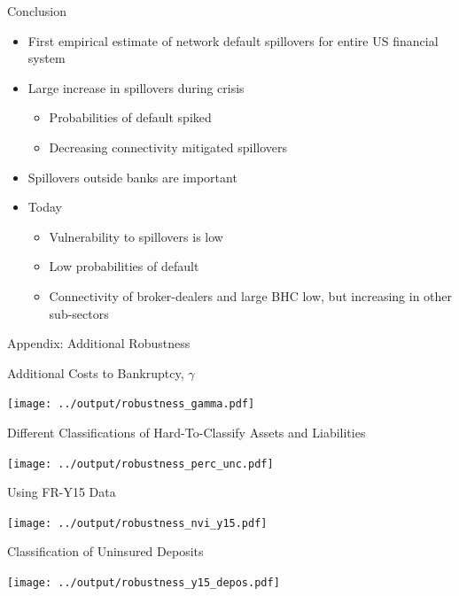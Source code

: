 \documentclass[12pt,envcountsect, leqno,xcolor=dvipsnames]{beamer}
\newcommand{\bi}{\begin{itemize}}
\newcommand{\ei}{\end{itemize}}
\begin{document}
\begin{frame}{Conclusion}
\bi
\item First empirical estimate of network default spillovers for entire US financial system
\item Large increase in spillovers during crisis
	\bi
	\item Probabilities of default spiked
	\item Decreasing connectivity mitigated spillovers
	\ei
\item Spillovers outside banks are important
\item Today
	\bi
	\item Vulnerability to spillovers is low
	\item Low probabilities of default
	\item Connectivity of broker-dealers and large BHC low, but increasing in other sub-sectors
	\ei
\ei
\end{frame}

\begin{frame}
 \titlepage

\end{frame}

\begin{frame}

{\Large Appendix: Additional Robustness}

\end{frame}

\begin{frame}{Additional Costs to Bankruptcy, $\gamma$}

\begin{center}
\texttt{[image: ../output/robustness\_gamma.pdf]}
\end{center}

\end{frame}

\begin{frame}{Different Classifications of Hard-To-Classify Assets and Liabilities}

\begin{center}
\texttt{[image: ../output/robustness\_perc\_unc.pdf]}
\end{center}

\end{frame}

\begin{frame}{Using FR-Y15 Data}

\begin{center}
\texttt{[image: ../output/robustness\_nvi\_y15.pdf]}
\end{center}

\end{frame}
\begin{frame}{Classification of Uninsured Deposits}

\begin{center}
\texttt{[image: ../output/robustness\_y15\_depos.pdf]}
\end{center}

\end{frame}
\end{document}
